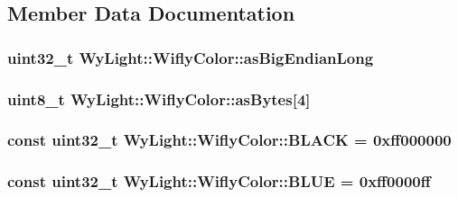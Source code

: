 \subsection{Member Data Documentation}
\hypertarget{class_wy_light_1_1_wifly_color_ab82810306a5a34f69d13193b476aec66}{
\subsubsection[{as\-Big\-Endian\-Long}]{\setlength{\rightskip}{0pt plus 5cm}uint32\-\_\-t Wy\-Light\-::\-Wifly\-Color\-::as\-Big\-Endian\-Long}}\label{class_wy_light_1_1_wifly_color_ab82810306a5a34f69d13193b476aec66}
\hypertarget{class_wy_light_1_1_wifly_color_a2a018c60f9d938f55f83c2164f16b293}{
\subsubsection[{as\-Bytes}]{\setlength{\rightskip}{0pt plus 5cm}uint8\-\_\-t Wy\-Light\-::\-Wifly\-Color\-::as\-Bytes\mbox{[}4\mbox{]}}}\label{class_wy_light_1_1_wifly_color_a2a018c60f9d938f55f83c2164f16b293}
\hypertarget{class_wy_light_1_1_wifly_color_a543f570e0e4776da66f2bc85f08f2af7}{
\subsubsection[{B\-L\-A\-C\-K}]{\setlength{\rightskip}{0pt plus 5cm}const uint32\-\_\-t Wy\-Light\-::\-Wifly\-Color\-::\-B\-L\-A\-C\-K = 0xff000000\hspace{0.3cm}{\ttfamily [static]}}}\label{class_wy_light_1_1_wifly_color_a543f570e0e4776da66f2bc85f08f2af7}
\hypertarget{class_wy_light_1_1_wifly_color_a9b59f5a5f52beba738ce799799d273b7}{
\subsubsection[{B\-L\-U\-E}]{\setlength{\rightskip}{0pt plus 5cm}const uint32\-\_\-t Wy\-Light\-::\-Wifly\-Color\-::\-B\-L\-U\-E = 0xff0000ff\hspace{0.3cm}{\ttfamily [static]}}}\label{class_wy_light_1_1_wifly_color_a9b59f5a5f52beba738ce799799d273b7}
